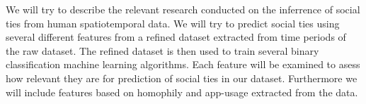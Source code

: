 We will try to describe the relevant research conducted on the inferrence of social ties from human spatiotemporal data. We will try to predict social ties using several different features from a refined dataset extracted from time periods of the raw dataset. The refined dataset is then used to train several binary classification machine learning algorithms. Each feature will be examined to asess how relevant they are for prediction of social ties in our dataset. Furthermore we will include features based on homophily and app-usage extracted from the data.

